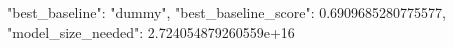 {
  "best_baseline": "dummy",
  "best_baseline_score": 0.6909685280775577,
  "model_size_needed": 2.724054879260559e+16
}